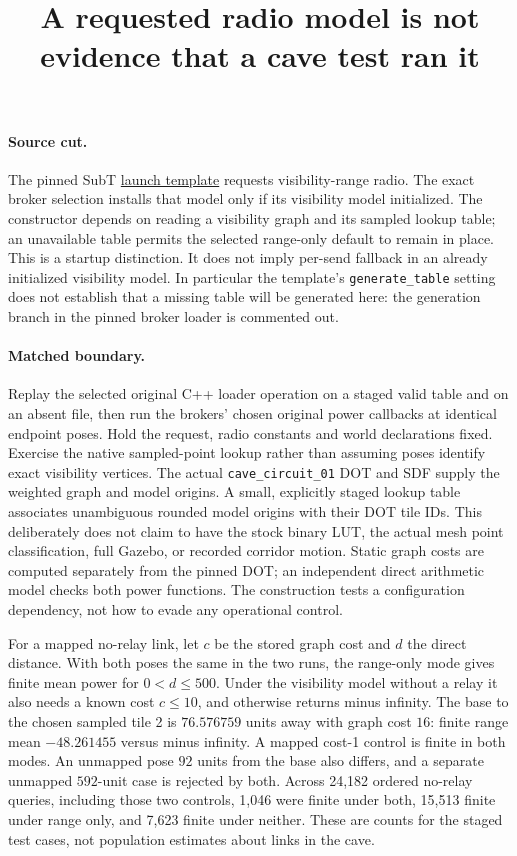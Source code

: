 \documentclass[11pt]{article}
\title{A requested radio model is not evidence that a cave test ran it}
\author{}\date{}
\begin{document}
\maketitle
\paragraph{Source cut.} The pinned SubT
\href{https://github.com/osrf/subt/blob/083c6a8acb0c25aa1a35e34517e628cd3b52ae77/subt_ign/launch/cloudsim_sim.ign}
{launch template} requests visibility-range radio. The exact broker
selection installs that model only if its visibility model initialized.
The constructor depends on reading a visibility graph and its sampled
lookup table; an unavailable table permits the selected range-only default
to remain in place. This is a startup distinction. It does not imply
per-send fallback in an already initialized visibility model. In particular
the template's \texttt{generate\_table} setting does not establish that a
missing table will be generated here: the generation branch in the pinned
broker loader is commented out.

\paragraph{Matched boundary.} Replay the selected original C++ loader
operation on a staged valid table and on an absent file, then run the
brokers' chosen original power callbacks at identical endpoint poses.
Hold the request, radio constants and world declarations fixed. Exercise
the native sampled-point lookup rather than assuming poses identify exact
visibility vertices. The actual \texttt{cave\_circuit\_01} DOT and SDF
supply the weighted graph and model origins. A small, explicitly staged
lookup table associates unambiguous rounded model origins with their DOT
tile IDs. This deliberately does not claim to have the stock binary LUT,
the actual mesh point classification, full Gazebo, or recorded corridor
motion. Static graph costs are computed separately from the pinned DOT;
an independent direct arithmetic model checks both power functions.
The construction tests a configuration dependency, not how to evade any
operational control.

For a mapped no-relay link, let \(c\) be the stored graph cost and \(d\)
the direct distance. With both poses the same in the two runs, the
range-only mode gives finite mean power for \(0<d\le500\). Under the
visibility model without a relay it also needs a known cost \(c\le10\),
and otherwise returns minus infinity. The base to the chosen sampled
tile 2 is \(76.576759\) units away with graph cost \(16\): finite range mean
\(-48.261455\) versus minus infinity. A mapped cost-1 control is finite in
both modes. An unmapped pose \(92\) units from the base also differs,
and a separate unmapped \(592\)-unit case is rejected by both. Across
24,182 ordered no-relay queries, including those two controls, 1,046
were finite under both, 15,513 finite under range only, and 7,623 finite
under neither. These are counts for the staged test cases, not population
estimates about links in the cave.
\end{document}
